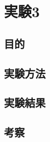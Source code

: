 \documentclass[uplatex]{jsarticle}
\begin{document}
\section{実験3}
\subsection{目的}
\subsection{実験方法}
\subsection{実験結果}
\subsection{考察}
\end{document}
